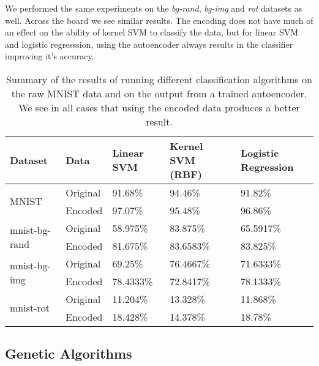 We performed the same experiments on the \textit{bg-rand}, \textit{bg-img} and 
\textit{rot} datasets as well. Across the board we see similar results. The encoding does not have much of
an effect on the ability of kernel SVM to classify the data, but for linear SVM and logistic regresssion, 
using the autoencoder always results in the classifier improving it's accuracy. 


\begin{table}[h]
	\centering
\begin{tabular}{ll|lll}
    Dataset                        & Data               & Linear SVM & Kernel SVM (RBF) & Logistic Regression \\ \hline
    \multirow{2}{*}{MNIST}         & Original           & 91.68\%    & 94.46\%          & 91.82\%             \\
                                   & Encoded            & 97.07\%    & 95.48\%          & 96.86\%             \\ \hline
    \multirow{2}{*}{mnist-bg-rand} & Original           & 58.975\%   & 83.875\%         & 65.5917\%           \\
                                   & Encoded            & 81.675\%   & 83.6583\%        & 83.825\%            \\ \hline
    \multirow{2}{*}{mnist-bg-img}  & Original           & 69.25\%    & 76.4667\%        & 71.6333\%           \\
                                   & Encoded            & 78.4333\%  & 72.8417\%        & 78.1333\%           \\ \hline
    \multirow{2}{*}{mnist-rot}     & Original           & 11.204\%   & 13.328\%         & 11.868\%           \\
                                   & Encoded            & 18.428\%   & 14.378\%         & 18.78\%
\end{tabular}
	\caption{Summary of the results of running different classification algorithms on the raw MNIST data and on the output from a trained autoencoder. We
	see in all cases that using the encoded data produces a better result.}
	\label{tab:classvsenc}
\end{table}

\subsection{Genetic Algorithms}

